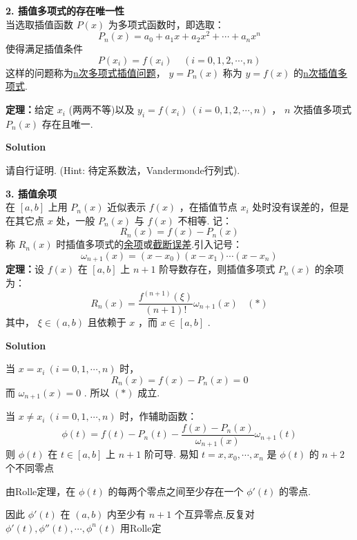 \documentclass[11pt,a4paper,openany,oneside]{book}
\newcommand\Solution{\noindent\textbf{\textsf{Solution}}\par\medskip}
\begin{document}
\textbf{2. 插值多项式的存在唯一性}  \\
当选取插值函数 $ P(x) $ 为多项式函数时，即选取：
 $$  P_n(x) = a_0 + a_1x + a_2x^2 + \cdots + a_nx^n  $$ 
使得满足插值条件
 $$  P(x_i) = f(x_i) \ \ \ \ \ (i = 0, 1, 2, \cdots, n)  $$ 
这样的问题称为\underline{n次多项式插值问题}， $ y = P_n(x) $ 称为 $ y=f(x) $ 的\underline{n次插值多项式}. \\

\begin{myexample}
	\textbf{定理：}给定 $ x_i $ (两两不等)以及 $ y_i = f(x_i)\ (i = 0, 1, 2, \cdots, n) $ ， $ n $ 次插值多项式 $ P_n(x) $ 存在且唯一. 
	
\end{myexample}
\Solution
请自行证明. (Hint: 待定系数法，Vandermonde行列式). \\

\begin{myexample}
	\textbf{3. 插值余项} \\ 
	在 $ [a,b] $ 上用 $ P_n(x) $ 近似表示 $ f(x) $ ，在插值节点 $ x_i $ 处时没有误差的，但是在其它点 $ x $ 处，一般 $ P_n(x) $ 与 $ f(x) $ 不相等. 记：
	 $$  R_n(x) = f(x) - P_n(x)  $$ 
	称 $ R_n(x) $ 时插值多项式的\underline{余项}或\underline{截断误差}.引入记号：
	 $$  \omega_{n+1}(x) = (x-x_0)(x-x_1)\cdots(x-x_n)  $$ 
	\textbf{定理：}设 $ f(x) $ 在 $ [a,b] $ 上 $ n+1 $ 阶导数存在，则插值多项式 $ P_n(x) $ 的余项为：
	 $$  R_n(x) = \dfrac{f^{(n+1)}(\xi)}{(n+1)!}\omega_{n+1}(x) \ \ \ \ (*)  $$ 
	\hspace{2.3em} 其中， $ \xi \in (a,b) $ 且依赖于 $ x $ ，而 $ x \in [a,b] $ . \\
	
\end{myexample}
\Solution 当 $ x = x_i\ (i = 0, 1, \cdots, n) $ 时，
 $$  R_n(x) = f(x) - P_n(x) = 0  $$ 
\hspace{2.7em} 而 $ \omega_{n+1}(x) = 0 $ . 所以 $ (*) $ 成立. 

\hspace{2.7em} 当 $ x \neq x_i\ (i=0, 1, \cdots, n) $ 时，作辅助函数：
 $$  \phi(t) = f(t) - P_n(t) - \dfrac{f(x) - P_n(x)}{\omega_{n+1}(x)}\omega_{n+1}(t)  $$  
\hspace{2.7em} 则 $ \phi(t) $ 在 $ t \in [a,b] $ 上 $ n+1 $ 阶可导. 易知 $ t = x, x_0,\cdots, x_n $ 是 $ \phi(t) $ 的 $ n+2 $ 个不同零点

\hspace{2.7em} 由Rolle定理，在 $ \phi(t) $ 的每两个零点之间至少存在一个 $ \phi'(t) $ 的零点. 

\hspace{2.7em} 因此 $ \phi'(t) $ 在 $ (a,b) $ 内至少有 $ n+1 $ 个互异零点.反复对 $ \phi'(t), \phi''(t), \cdots, \phi^{n}(t) $ 用Rolle定
\end{document}
